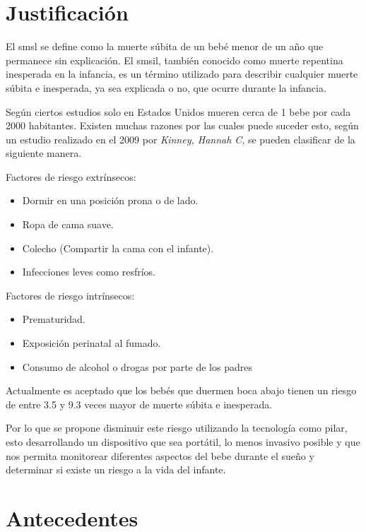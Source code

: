 
%
%
\section{Justificación}

El \acrfull{smsl} se define como la muerte súbita de un bebé menor de un año que permanece sin explicación. El \acrfull{smsil}, también conocido como muerte repentina inesperada en la infancia, es un término utilizado para describir cualquier muerte súbita e inesperada, ya sea explicada o no, que ocurre durante la infancia.

Según ciertos estudios\cite{b1} solo en Estados Unidos mueren cerca de 1 bebe por cada 2000 habitantes.
Existen muchas razones por las cuales puede suceder esto, según un estudio realizado en el 2009 por \emph{Kinney, Hannah C}\cite{b2}, se pueden clasificar de la siguiente manera.

Factores de riesgo extrínsecos:
\begin{itemize}
    \item Dormir en una posición prona o de lado.
    \item Ropa de cama suave.
    \item Colecho (Compartir la cama con el infante).
    \item Infecciones leves como resfríos.
\end{itemize}

Factores de riesgo intrínsecos:
\begin{itemize}
    \item Prematuridad.
    \item Exposición perinatal al fumado.
    \item Consumo de alcohol o drogas por parte de los padres
\end{itemize}

Actualmente es aceptado que los bebés que duermen boca abajo tienen un riesgo de entre 3.5 y 9.3 veces mayor de muerte súbita e inesperada.

Por lo que se propone disminuir este riesgo utilizando la tecnología como pilar, esto desarrollando un dispositivo que sea portátil, lo menos invasivo posible y que nos permita monitorear diferentes aspectos del bebe durante el sueño y determinar si existe un riesgo a la vida del infante.

\section{Antecedentes}

